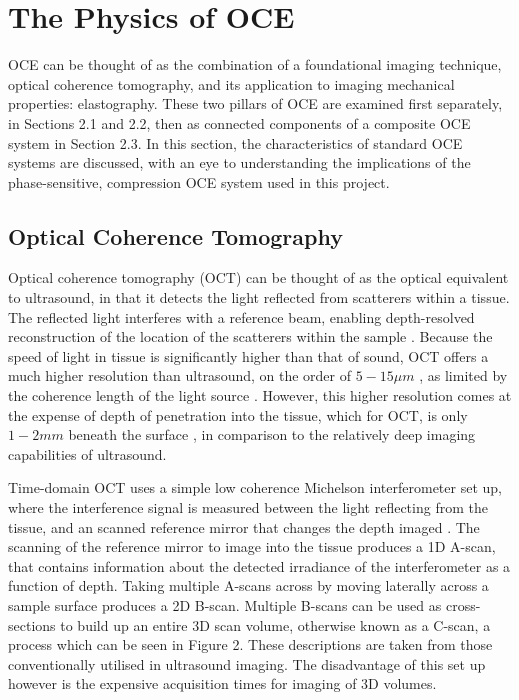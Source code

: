 \chapter{The Physics of OCE}

OCE can be thought of as the combination of a foundational imaging technique, optical coherence tomography, and its application to imaging mechanical properties: elastography. These two pillars of OCE are examined first separately, in Sections 2.1 and 2.2, then as connected components of a composite OCE system in Section 2.3. In this section, the characteristics of standard OCE systems are discussed, with an eye to understanding the implications of the phase-sensitive, compression OCE system used in this project.

\section{Optical Coherence Tomography}
Optical coherence tomography (OCT) can be thought of as the optical equivalent to ultrasound, in that it detects the light reflected from scatterers within a tissue. The reflected light interferes with a reference beam, enabling depth-resolved reconstruction of the location of the scatterers within the sample \cite{chin_parametric_2016}. Because the speed of light in tissue is significantly higher than that of sound, OCT offers a much higher resolution than ultrasound, on the order of $5-15 \mu m$ \cite{kennedy_emergence_2017}, as limited by the coherence length of the light source \cite{huang_optical_1991}. However, this higher resolution comes at the expense of depth of penetration into the tissue, which for OCT, is only $1-2mm$ beneath the surface \cite{schmitt_optical_1999}, in comparison to the relatively deep imaging capabilities of ultrasound.

Time-domain OCT uses a simple low coherence Michelson interferometer set up, where the interference signal is measured between the light reflecting from the tissue, and an scanned reference mirror that changes the depth imaged \cite{huang_optical_1991}. The scanning of the reference mirror to image into the tissue produces a 1D A-scan, that contains information about the detected irradiance of the interferometer as a function of depth. Taking multiple A-scans across by moving laterally across a sample surface produces a 2D B-scan. Multiple B-scans can be used as cross-sections to build up an entire 3D scan volume, otherwise known as a C-scan, a process which can be seen in Figure 2. These descriptions are taken from those conventionally utilised in ultrasound imaging. The disadvantage of this set up however is the expensive acquisition times for imaging of 3D volumes.

